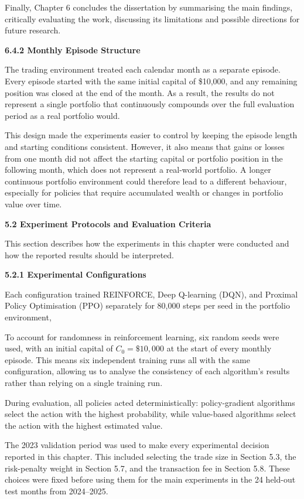 Finally, Chapter 6 concludes the dissertation by summarising the main
findings, critically evaluating the work, discussing its limitations and
possible directions for future research.

\textbf{\hfill\break
}

\textbf{6.4.2 Monthly Episode Structure}

The trading environment treated each calendar month as a separate
episode. Every episode started with the same initial capital of
\$10,000, and any remaining position was closed at the end of the month.
As a result, the results do not represent a single portfolio that
continuously compounds over the full evaluation period as a real
portfolio would.

This design made the experiments easier to control by keeping the
episode length and starting conditions consistent. However, it also
means that gains or losses from one month did not affect the starting
capital or portfolio position in the following month, which does not
represent a real-world portfolio. A longer continuous portfolio
environment could therefore lead to a different behaviour, especially
for policies that require accumulated wealth or changes in portfolio
value over time.

\textbf{5.2 Experiment Protocols and Evaluation Criteria}

This section describes how the experiments in this chapter were
conducted and how the reported results should be interpreted.

\textbf{5.2.1 Experimental Configurations}

Each configuration trained REINFORCE, Deep Q-learning (DQN), and
Proximal Policy Optimisation (PPO) separately for 80,000 steps per seed
in the portfolio environment,

To account for randomness in reinforcement learning, six random seeds
were used, with an initial capital of \(C_{0} = \$ 10,000\) at the start
of every monthly episode. This means six independent training runs all
with the same configuration, allowing us to analyse the consistency of
each algorithm's results rather than relying on a single training run.

During evaluation, all policies acted deterministically: policy-gradient
algorithms select the action with the highest probability, while
value-based algorithms select the action with the highest estimated
value.

The 2023 validation period was used to make every experimental decision
reported in this chapter. This included selecting the trade size in
Section 5.3, the risk-penalty weight in Section 5.7, and the transaction
fee in Section 5.8. These choices were fixed before using them for the
main experiments in the 24 held-out test months from 2024--2025.

